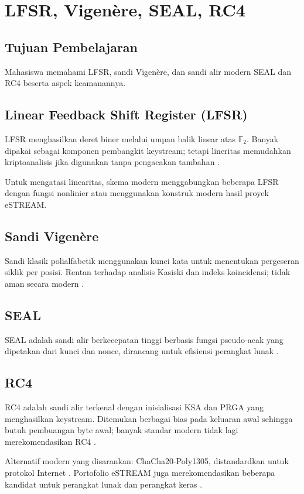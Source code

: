 \documentclass[../main.tex]{subfiles}
\begin{document}
\chapter{LFSR, Vigen\`{e}re, SEAL, RC4}

\section{Tujuan Pembelajaran}
Mahasiswa memahami LFSR, sandi Vigen\`{e}re, dan sandi alir modern SEAL dan RC4 beserta aspek keamanannya.

\section{Linear Feedback Shift Register (LFSR)}
LFSR menghasilkan deret biner melalui umpan balik linear atas \(\mathbb{F}_2\). Banyak dipakai sebagai komponen pembangkit keystream; tetapi lineritas memudahkan kriptoanalisis jika digunakan tanpa pengacakan tambahan \citep{menezes}.

Untuk mengatasi linearitas, skema modern menggabungkan beberapa LFSR dengan fungsi nonlinier atau menggunakan konstruk modern hasil proyek eSTREAM.

\section{Sandi Vigen\`{e}re}
Sandi klasik polialfabetik menggunakan kunci kata untuk menentukan pergeseran siklik per posisi. Rentan terhadap analisis Kasiski dan indeks koincidensi; tidak aman secara modern \citep{stallings}.

\section{SEAL}
SEAL adalah sandi alir berkecepatan tinggi berbasis fungsi pseudo-acak yang dipetakan dari kunci dan nonce, dirancang untuk efisiensi perangkat lunak \citep{seal}.

\section{RC4}
RC4 adalah sandi alir terkenal dengan inisialisasi KSA dan PRGA yang menghasilkan keystream. Ditemukan berbagai bias pada keluaran awal sehingga butuh pembuangan byte awal; banyak standar modern tidak lagi merekomendasikan RC4 \citep{rc4,stallings}.

Alternatif modern yang disarankan: ChaCha20-Poly1305, distandardkan untuk protokol Internet \citep{rfc8439}. Portofolio eSTREAM juga merekomendasikan beberapa kandidat untuk perangkat lunak dan perangkat keras \citep{estream}.
\end{document}
